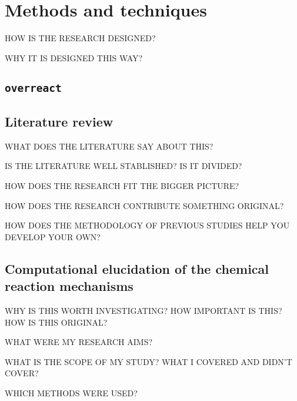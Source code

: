 \chapter{Methods and techniques}%
\label{ch:methods}

HOW IS THE RESEARCH DESIGNED?\@

WHY IT IS DESIGNED THIS WAY?\@

\section{\texttt{overreact}}
\label{sec:overreact-methods}

\section{Literature review}%
\label{sec:literature-review}

WHAT DOES THE LITERATURE SAY ABOUT THIS?\@

IS THE LITERATURE WELL STABLISHED?\@
IS IT DIVIDED?\@

HOW DOES THE RESEARCH FIT THE BIGGER PICTURE?\@

HOW DOES THE RESEARCH CONTRIBUTE SOMETHING ORIGINAL?\@

HOW DOES THE METHODOLOGY OF PREVIOUS STUDIES HELP YOU DEVELOP YOUR OWN?\@

\section{Computational elucidation of the chemical reaction mechanisms}

WHY IS THIS WORTH INVESTIGATING?\@
HOW IMPORTANT IS THIS?\@
HOW IS THIS ORIGINAL?\@

WHAT WERE MY RESEARCH AIMS?\@

WHAT IS THE SCOPE OF MY STUDY?\@
WHAT I COVERED AND DIDN'T COVER?\@

WHICH METHODS WERE USED?\@
